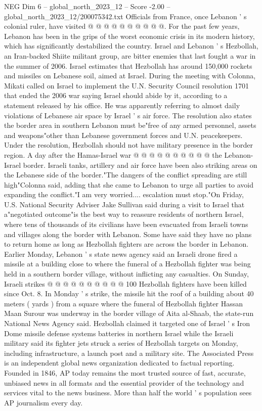 \begin{textsample}{NEG Dim 6 – global\_north\_2023\_12 – Score -2.00 – global\_north\_2023\_12/200075342.txt}
Officials from France, once Lebanon ' s colonial ruler, have visited @ @ @ @ @ @ @ @ @ @.
For the past few years, Lebanon has been in the grips of the worst economic crisis in its modern history, which has significantly destabilized the country.
Israel and Lebanon ' s Hezbollah, an Iran-backed Shiite militant group, are bitter enemies that last fought a war in the summer of 2006.
Israel estimates that Hezbollah has around 150,000 rockets and missiles on Lebanese soil, aimed at Israel.
During the meeting with Colonna, Mikati called on Israel to implement the U.N.
Security Council resolution 1701 that ended the 2006 war saying Israel should abide by it, according to a statement released by his office.
He was apparently referring to almost daily violations of Lebanese air space by Israel ' s air force.
The resolution also states the border area in southern Lebanon must be"free of any armed personnel, assets and weapons"other than Lebanese government forces and U.N. peacekeepers.
Under the resolution, Hezbollah should not have military presence in the border region.
A day after the Hamas-Israel war @ @ @ @ @ @ @ @ @ @ the Lebanon-Israel border.
Israeli tanks, artillery and air force have been also striking areas on the Lebanese side of the border."The dangers of the conflict spreading are still high"Colonna said, adding that she came to Lebanon to urge all parties to avoid expanding the conflict."I am very worried.... escalation must stop."On Friday, U.S.
National Security Adviser Jake Sullivan said during a visit to Israel that a"negotiated outcome"is the best way to reassure residents of northern Israel, where tens of thousands of its civilians have been evacuated from Israeli towns and villages along the border with Lebanon.
Some have said they have no plans to return home as long as Hezbollah fighters are across the border in Lebanon.
Earlier Monday, Lebanon ' s state news agency said an Israeli drone fired a missile at a building close to where the funeral of a Hezbollah fighter was being held in a southern border village, without inflicting any casualties.
On Sunday, Israeli strikes @ @ @ @ @ @ @ @ @ @ 100 Hezbollah fighters have been killed since Oct. 8.
In Monday ' s strike, the missile hit the roof of a building about 40 meters ( yards ) from a square where the funeral of Hezbollah fighter Hassan Maan Surour was underway in the border village of Aita al-Shaab, the state-run National News Agency said.
Hezbollah claimed it targeted one of Israel ' s Iron Dome missile defense systems batteries in northern Israel while the Israeli military said its fighter jets struck a series of Hezbollah targets on Monday, including infrastructure, a launch post and a military site.
The Associated Press is an independent global news organization dedicated to factual reporting.
Founded in 1846, AP today remains the most trusted source of fast, accurate, unbiased news in all formats and the essential provider of the technology and services vital to the news business.
More than half the world ' s population sees AP journalism every day.

\end{textsample}

